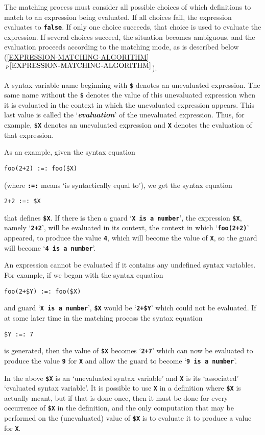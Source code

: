 \documentclass[12pt]{article}
\makeatletter
\newcommand{\TT}[1]{{\tt \bfseries #1}}
\newcommand{\key}[1]{{\bf \em #1}\index{#1}}
\newcommand{\ttmkey}[2]{\TT{#1}\index{#1@{\tt #1}!#2}}
\newcommand{\secref}[1]{\ref{#1}$\,^{p\,\pageref{#1}}$}
\makeatother
\begin{document}
The matching process must consider all possible choices of which definitions
to match to an expression being evaluated.  If all choices fail, the
expression evaluates to \TT{false}.  If only one choice succeeds, that
choice is used to evaluate the expression.  If several choices succeed,
the situation becomes ambiguous, and the evaluation proceeds according
to the matching mode, as is described below
(\secref{EXPRESSION-MATCHING-ALGORITHM}).

A syntax variable name beginning with
\ttmkey{\$}{in syntax variable name} denotes an unevaluated
expression.  The same name without the \TT{\$} denotes the value
of this unevaluated expression when it is evaluated
in the context in which the unevaluated expression appears.
This last value is called the `\key{evaluation}' of the unevaluated
expression.  Thus, for example, \TT{\$X} denotes an unevaluated
expression and \TT{X} denotes the evaluation of that expression.

As an example, given the syntax equation
\begin{center}
\verb|foo(2+2) :=: foo($X)|
\end{center}
(where \TT{:=:} means `is syntactically equal to'), we get
the syntax equation
\begin{center}
\verb|2+2 :=: $X|
\end{center}
that defines \TT{\$X}.  If there is then a guard `\TT{X is a number}',
the expression \TT{\$X}, namely `\TT{2+2}',
will be evaluated in its context, the context in which `\TT{foo(2+2)}'
appeared, to produce the value \TT{4}, which will become the value of
\TT{X}, so the guard will become `\TT{4 is a number}'.

An expression cannot be evaluated if it contains any undefined syntax
variables.  For example, if we began with the syntax equation
\begin{center}
\verb|foo(2+$Y) :=: foo($X)|
\end{center}
and guard `\TT{X is a number}', \TT{\$X} would be `\TT{2+\$Y}' which
could not be evaluated.  If at some later time in the matching process
the syntax equation
\begin{center}
\verb|$Y :=: 7|
\end{center}
is generated, then the value of \TT{\$X} becomes `\TT{2+7}'
which can now be evaluated to produce the value \TT{9} for \TT{X}
and allow the guard to become `\TT{9 is a number}'.

In the above \TT{\$X} is an `unevaluated syntax variable' and
\TT{X} is its `associated' `evaluated syntax variable'.  It is
possible to use \TT{X} in a definition where \TT{\$X} is actually
meant, but if that is done once, then it must be done for every occurrence
of \TT{\$X} in the definition, and the only computation that may be
performed on the (unevaluated) value of \TT{\$X} is to evaluate it to
produce a value for \TT{X}.
\end{document}
